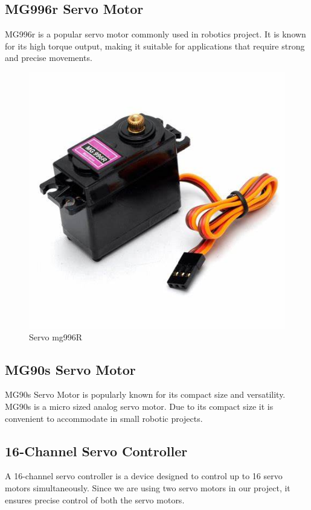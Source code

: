   \subsection{MG996r Servo Motor}
  MG996r is a popular servo motor commonly used in robotics project. It is known for its high torque output, making it suitable for applications that require strong and precise movements.
  \begin{figure}[h]
    \centering
    \includegraphics[width=1\linewidth]{Graphics/servoooo.jpg}
    \caption{Servo mg996R}
    \label{fig:enter-label}
\end{figure}
  \subsection{MG90s Servo Motor}
  MG90s Servo Motor is popularly known for its compact size and versatility.
  MG90s is a micro sized analog servo motor. Due to its compact size it is convenient to accommodate in small robotic projects.
  \subsection{16-Channel Servo Controller}
  A 16-channel servo controller is a device designed to control up to 16 servo motors simultaneously. Since we are using two servo motors in our project, it ensures precise control of both the servo motors.
